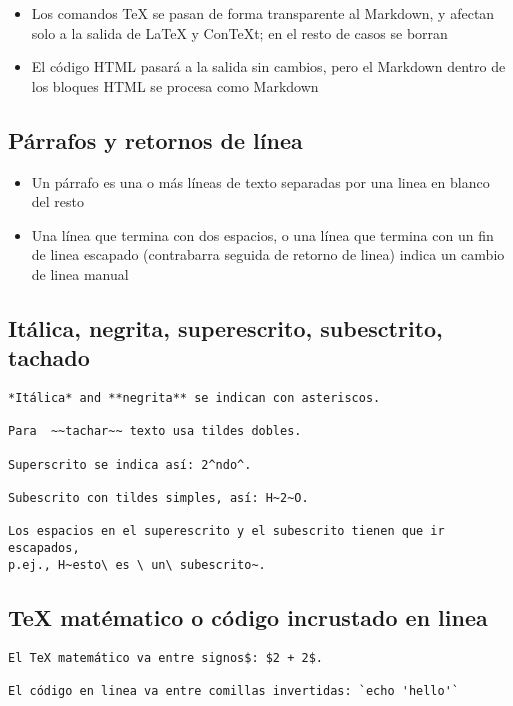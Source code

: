 \documentclass[12pt,spanish,]{article}
\providecommand{\tightlist}{%
  \setlength{\itemsep}{0pt}\setlength{\parskip}{0pt}}
\begin{document}
\begin{itemize}
\tightlist
\item
  Los comandos TeX se pasan de forma transparente al Markdown, y afectan
  solo a la salida de LaTeX y ConTeXt; en el resto de casos se borran
\item
  El código HTML pasará a la salida sin cambios, pero el Markdown dentro
  de los bloques HTML se procesa como Markdown
\end{itemize}

\subsection{Párrafos y retornos de
línea}\label{puxe1rrafos-y-retornos-de-luxednea}

\begin{itemize}
\tightlist
\item
  Un párrafo es una o más líneas de texto separadas por una linea en
  blanco del resto
\item
  Una línea que termina con dos espacios, o una línea que termina con un
  fin de linea escapado (contrabarra seguida de retorno de linea) indica
  un cambio de linea manual
\end{itemize}

\subsection{Itálica, negrita, superescrito, subesctrito,
tachado}\label{ituxe1lica-negrita-superescrito-subesctrito-tachado}

\begin{verbatim}
*Itálica* and **negrita** se indican con asteriscos.

Para  ~~tachar~~ texto usa tildes dobles.

Superscrito se indica así: 2^ndo^.

Subescrito con tildes simples, así: H~2~O.

Los espacios en el superescrito y el subescrito tienen que ir escapados,
p.ej., H~esto\ es \ un\ subescrito~.
\end{verbatim}

\subsection{TeX matématico o código incrustado en
linea}\label{tex-matuxe9matico-o-cuxf3digo-incrustado-en-linea}

\begin{verbatim}
El TeX matemático va entre signos$: $2 + 2$.

El código en linea va entre comillas invertidas: `echo 'hello'`
\end{verbatim}
\end{document}
